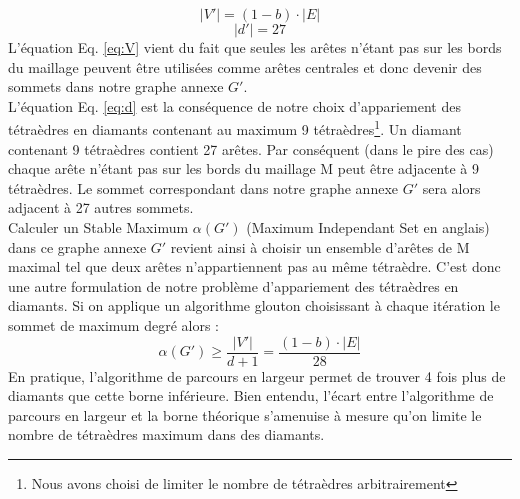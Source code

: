 \begin{equation}
\label{eq:V}
|V'|=(1-b)\cdot |E|
\end{equation}
\begin{equation}
\label{eq:d}
|d'|= 27
\end{equation}
L'équation Eq. \ref{eq:V} vient du fait que seules les arêtes n'étant pas sur les bords du maillage peuvent être utilisées comme arêtes centrales et donc devenir des sommets dans notre graphe annexe $G'$.\\
L'équation Eq. \ref{eq:d} est la conséquence de notre choix d'appariement des tétraèdres en diamants contenant au maximum 9 tétraèdres\footnote{Nous avons choisi de limiter le nombre de tétraèdres arbitrairement}. Un diamant contenant 9 tétraèdres contient 27 arêtes. Par conséquent (dans le pire des cas) chaque arête n'étant pas sur les bords du maillage M peut être adjacente à 9 tétraèdres. Le sommet correspondant dans notre graphe annexe $G'$ sera alors adjacent à 27 autres sommets.\\
Calculer un Stable Maximum $\alpha(G')$ (Maximum Independant Set en anglais) dans ce graphe annexe $G'$ revient ainsi à choisir un ensemble d'arêtes de M maximal tel que deux arêtes n'appartiennent pas au même tétraèdre. C'est donc une autre formulation de notre problème d'appariement des tétraèdres en diamants. Si on applique un algorithme glouton choisissant à chaque itération le sommet de maximum degré alors :
\begin{equation}
\alpha(G')\geqslant \frac{|V'|}{d+1} = \frac{(1-b)\cdot |E|}{28}
\end{equation}
En pratique, l'algorithme de parcours en largeur permet de trouver 4 fois plus de diamants que cette borne inférieure. Bien entendu, l'écart entre l'algorithme de parcours en largeur et la borne théorique s'amenuise à mesure qu'on limite le nombre de tétraèdres maximum dans des diamants. 
